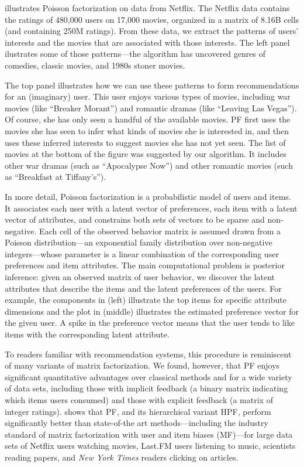  illustrates Poisson factorization on data
from Netflix.  The Netflix data contains the ratings of 480,000 users
on 17,000 movies, organized in a matrix of 8.16B cells (and containing
250M ratings).  From these data, we extract the patterns of users'
interests and the movies that are associated with those interests.
The left panel ilustrates some of those patterns---the algorithm has
uncovered genres of comedies, classic movies, and 1980s stoner movies.

The top panel illustrates how we can use these patterns to form
recommendations for an (imaginary) user.  This user enjoys various
types of movies, including war movies (like ``Breaker Morant'') and
romantic dramas (like ``Leaving Las Vegas'').  Of course, she has only
seen a handful of the available movies.  PF first uses the movies she
has seen to infer what kinds of movies she is interested in, and then
uses these inferred interests to suggest movies she has not yet seen.
The list of movies at the bottom of the figure was suggested by our
algorithm. It includes other war dramas (such as ``Apocalypse Now'')
and other romantic movies (such as ``Breakfast at Tiffany's'').

In more detail, Poisson factorization is a probabilistic model of
users and items.  It associates each user with a latent vector of
preferences, each item with a latent vector of attributes, and
constrains both sets of vectors to be sparse and non-negative.  Each
cell of the observed behavior matrix is assumed drawn from a Poisson
distribution---an exponential family distribution over non-negative
integers---whose parameter is a linear combination of the
corresponding user preferences and item attributes.  The main
computational problem is posterior inference: given an observed matrix
of user behavior, we discover the latent attributes that describe the
items and the latent preferences of the users.  For example, the
components in  (left) illustrate the top items for specific
attribute dimensions and the plot in  (middle) illustrates the
estimated preference vector for the given user.  A spike in the
preference vector means that the user tends to like items with the
corresponding latent attribute.

To readers familiar with recommendation systems, this procedure is
reminiscent of many variants of matrix factorization.  We found,
however, that PF enjoys significant quantitative advantages over
classical methods and for a wide variety of data sets, including those
with implicit feedback (a binary matrix indicating which items users
consumed) and those with explicit feedback (a matrix of integer
ratings).   shows that PF, and its
hierarchical variant HPF, perform significantly better than
state-of-the art methods---including the industry standard of matrix
factorization with user and item biases (MF)---for large data sets of
Netflix users watching movies, Last.FM users listening to music,
scientists reading papers, and \textit{New York Times} readers
clicking on articles.

